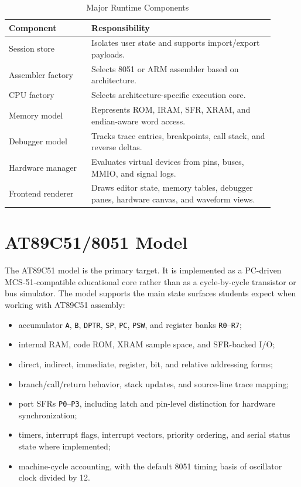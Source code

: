 \documentclass[conference]{IEEEtran}
\begin{document}
\begin{table}[t]
\caption{Major Runtime Components}
\label{tab:runtime_components}
\centering
\begin{tabular}{p{0.28\linewidth} p{0.62\linewidth}}
\toprule
\textbf{Component} & \textbf{Responsibility} \\
\midrule
Session store & Isolates user state and supports import/export payloads. \\
Assembler factory & Selects 8051 or ARM assembler based on architecture. \\
CPU factory & Selects architecture-specific execution core. \\
Memory model & Represents ROM, IRAM, SFR, XRAM, and endian-aware word access. \\
Debugger model & Tracks trace entries, breakpoints, call stack, and reverse deltas. \\
Hardware manager & Evaluates virtual devices from pins, buses, MMIO, and signal logs. \\
Frontend renderer & Draws editor state, memory tables, debugger panes, hardware canvas, and waveform views. \\
\bottomrule
\end{tabular}
\end{table}

\section{AT89C51/8051 Model}
The AT89C51 model is the primary target. It is implemented as a PC-driven MCS-51-compatible educational core rather than as a cycle-by-cycle transistor or bus simulator. The model supports the main state surfaces students expect when working with AT89C51 assembly:

\begin{itemize}
\item accumulator \texttt{A}, \texttt{B}, \texttt{DPTR}, \texttt{SP}, \texttt{PC}, \texttt{PSW}, and register banks \texttt{R0}--\texttt{R7};
\item internal RAM, code ROM, XRAM sample space, and SFR-backed I/O;
\item direct, indirect, immediate, register, bit, and relative addressing forms;
\item branch/call/return behavior, stack updates, and source-line trace mapping;
\item port SFRs \texttt{P0}--\texttt{P3}, including latch and pin-level distinction for hardware synchronization;
\item timers, interrupt flags, interrupt vectors, priority ordering, and serial status state where implemented;
\item machine-cycle accounting, with the default 8051 timing basis of oscillator clock divided by 12.
\end{itemize}
\end{document}

